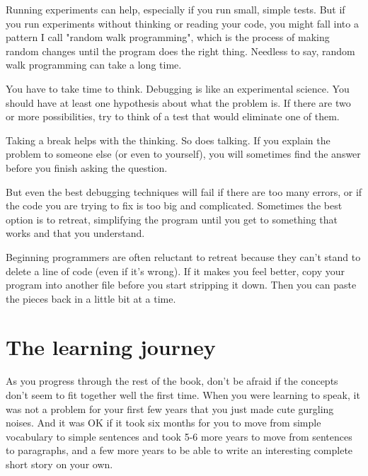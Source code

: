 
Running experiments can help, especially if you run small, simple tests.
But if you run experiments without thinking or reading your code, you
might fall into a pattern I call "random walk programming", which is the
process of making random changes until the program does the right thing.
Needless to say, random walk programming can take a long time.


You have to take time to think. Debugging is like an experimental
science. You should have at least one hypothesis about what the problem
is. If there are two or more possibilities, try to think of a test that
would eliminate one of them.

Taking a break helps with the thinking. So does talking. If you explain
the problem to someone else (or even to yourself), you will sometimes
find the answer before you finish asking the question. 

But even the best debugging techniques will fail if there are too many
errors, or if the code you are trying to fix is too big and complicated.
Sometimes the best option is to retreat, simplifying the program until
you get to something that works and that you understand.

Beginning programmers are often reluctant to retreat because they can't
stand to delete a line of code (even if it's wrong). If it makes you
feel better, copy your program into another file before you start
stripping it down. Then you can paste the pieces back in a little bit at
a time. 

\section{The learning journey}

As you progress through the rest of the book, don't be afraid if the concepts 
don't seem to fit together well the first time.  When you were learning to speak, 
it was not a problem  for your first few years that you just made cute gurgling noises.
And it was OK if it took six months for you to move from simple vocabulary to 
simple sentences and took 5-6 more years to move from sentences to paragraphs, and a
few more years to be able to write an interesting complete short story on your own.


